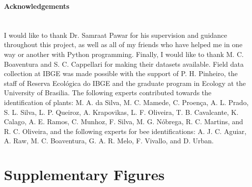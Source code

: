 \documentclass[11pt]{article}
\begin{document}
\newpage 
\vspace*{\fill}

{\huge\bfseries Acknowledgements} \label{sec: acknowledgements} \\
\\
\\
\large{I would like to thank Dr. Samraat Pawar for his supervision and guidance throughout this project, as well as  all of my friends who have helped me in one way or another with Python programming. Finally, I would like to thank M. C. Boaventura and S. C. Cappellari for making their datasets available. Field data collection at IBGE was made possible with the support of P. H. Pinheiro, the staff of Reserva Ecol\'{o}gica do IBGE and the graduate program in Ecology at the University of Brasilia. The following experts contributed towards the identification of plants: M. A. da Silva, M. C. Mamede, C. Proen\c{c}a, A. L. Prado, S. L. Silva, L. P. Queiroz, A. Krapovikas, L. F. Oliveira, T. B. Cavalcante, K. Calago, A. E. Ramos, C. Munhoz, F. Silva, M. G. N\'{o}brega, R. C. Martins, and R. C. Oliveira, and the following experts for bee identifications: A. J. C. Aguiar, A. Raw, M. C. Boaventura, G. A. R. Melo, F. Vivallo, and D. Urban.}
\vfill

\newpage



\newpage
\section{Supplementary Figures}

\end{document}

